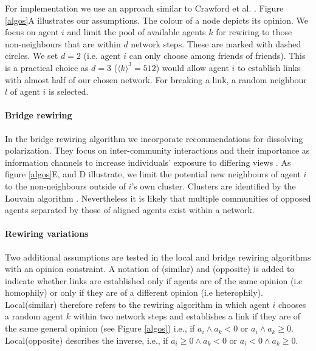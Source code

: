 \documentclass[unnumsec,webpdf,contemporary,large]{oup-authoring-template}%
\theoremstyle{thmstyleone}%
\theoremstyle{thmstyletwo}%
\theoremstyle{thmstylethree}%
\begin{document}
For implementation we use an approach similar to Crawford et al. \citep{crawford_resisting_2018}. Figure \ref{algos}A illustrates our assumptions. The colour of a node depicts its opinion. We focus on agent \(i\) and limit the pool of available agents \(k\) for rewiring to those non-neighbours that are within \(d\) network steps. These are marked with dashed circles. We set \(d = 2\) (i.e. agent \(i\) can only choose among friends of friends). This is a practical choice as \(d = 3\) ($\langle k \rangle ^3 = 512$) would allow agent \(i\) to establish links with almost half of our chosen network. For breaking a link, a random neighbour \(l\) of agent \(i\) is selected. 

\paragraph{Bridge rewiring}

In the bridge rewiring algorithm we incorporate recommendations for dissolving polarization. They focus on inter-community interactions and their importance as information channels to increase individuals' exposure to differing views \citep{andersson_dynamics_2021,gladston_social_2019,williams_network_2015,lee_homophily_2019,fotouhi_conjoining_2018}. As figure \ref{algos}E, and  D illustrate, we limit the potential new neighbours of agent \(i\) to the non-neighbours outside of \(i\)'s own cluster. Clusters are identified by the Louvain algorithm \citep{blondel_fast_2008}. Nevertheless it is likely that multiple communities of opposed agents separated by those of aligned agents exist within a network.

\paragraph{Rewiring variations}

Two additional assumptions are tested in the local and bridge rewiring algorithms with an opinion constraint. A notation of (similar) and (opposite) is added to indicate whether links are established only if agents are of the same opinion (i.e homophily) or only if they are of a different opinion (i.e heterophily). Local(similar) therefore refers to the rewiring algorithm in which agent \(i\) chooses a random agent \(k\) within two network steps and establishes a link if they are of the same general opinion (see Figure \ref{algos}) i.e., if \(a_i \wedge a_k < 0\) or \(a_i \wedge a_k \geq 0\). Local(opposite) describes the inverse, i.e., if \(a_i \geq 0 \wedge a_k < 0\) or \(a_i < 0 \wedge a_k \geq 0\).
\end{document}
